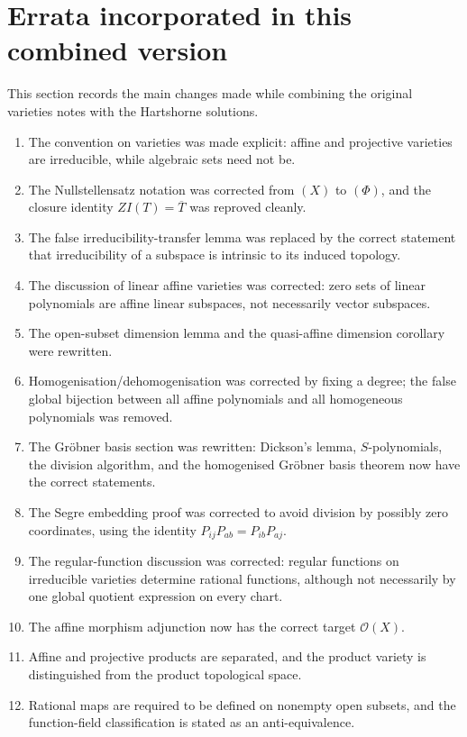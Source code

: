 \documentclass[12pt]{article}
\theoremstyle{plain}
\theoremstyle{definition}
\begin{document}
\section{Errata incorporated in this combined version}
\label{sec:errata-incorporated}
This section records the main changes made while combining the original varieties notes with the Hartshorne solutions.
\begin{enumerate}
\item The convention on varieties was made explicit: affine and projective varieties are irreducible, while algebraic sets need not be.
\item The Nullstellensatz notation was corrected from $(X)$ to $(\Phi)$, and the closure identity $ZI(T)=\overline T$ was reproved cleanly.
\item The false irreducibility-transfer lemma was replaced by the correct statement that irreducibility of a subspace is intrinsic to its induced topology.
\item The discussion of linear affine varieties was corrected: zero sets of linear polynomials are affine linear subspaces, not necessarily vector subspaces.
\item The open-subset dimension lemma and the quasi-affine dimension corollary were rewritten.
\item Homogenisation/dehomogenisation was corrected by fixing a degree; the false global bijection between all affine polynomials and all homogeneous polynomials was removed.
\item The Gr\"obner basis section was rewritten: Dickson's lemma, $S$-polynomials, the division algorithm, and the homogenised Gr\"obner basis theorem now have the correct statements.
\item The Segre embedding proof was corrected to avoid division by possibly zero coordinates, using the identity $P_{ij}P_{ab}=P_{ib}P_{aj}$.
\item The regular-function discussion was corrected: regular functions on irreducible varieties determine rational functions, although not necessarily by one global quotient expression on every chart.
\item The affine morphism adjunction now has the correct target $\mathcal O(X)$.
\item Affine and projective products are separated, and the product variety is distinguished from the product topological space.
\item Rational maps are required to be defined on nonempty open subsets, and the function-field classification is stated as an anti-equivalence.

\end{enumerate}
\end{document}
